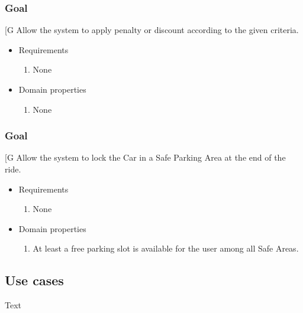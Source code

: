     \subsubsection{Goal }
    {[}G\arabic{goalctr}{]}
    Allow the system to apply penalty or discount according to the given criteria.
    \begin{itemize}
        \item Requirements
        \begin{enumerate}[REQ]
    			\item None
        \end{enumerate}
        \item Domain properties
        \begin{enumerate}[PRO]
    			\item None
        \end{enumerate}
    \end{itemize}
 
    \subsubsection{Goal }
    {[}G\arabic{goalctr}{]}
    Allow the system to lock the Car in a Safe Parking Area at the end of the ride.
    \begin{itemize}
        \item Requirements
        \begin{enumerate}[REQ]
    			\item None
        \end{enumerate}
        \item Domain properties
        \begin{enumerate}[PRO]
    			\item At least a free parking slot is available for the user among all Safe Areas.
        \end{enumerate}
    \end{itemize}

\subsection{Use cases}
Text